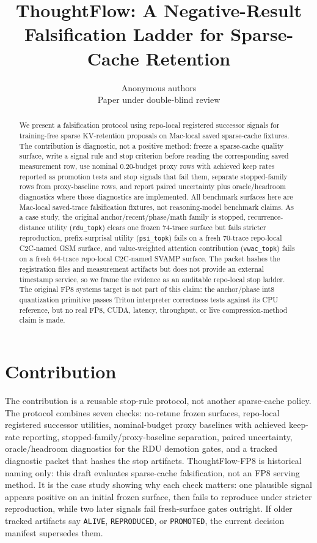 \documentclass{article}
\title{ThoughtFlow: A Negative-Result Falsification Ladder for Sparse-Cache Retention}
\author{Anonymous authors\\Paper under double-blind review}
\begin{document}
\maketitle

\begin{abstract}
We present a falsification protocol using repo-local registered successor signals for training-free sparse KV-retention proposals on Mac-local saved sparse-cache fixtures. The contribution is diagnostic, not a positive method: freeze a sparse-cache quality surface, write a signal rule and stop criterion before reading the corresponding saved measurement row, use nominal 0.20-budget proxy rows with achieved keep rates reported as promotion tests and stop signals that fail them, separate stopped-family rows from proxy-baseline rows, and report paired uncertainty plus oracle/headroom diagnostics where those diagnostics are implemented. All benchmark surfaces here are Mac-local saved-trace falsification fixtures, not reasoning-model benchmark claims. As a case study, the original anchor/recent/phase/math family is stopped, recurrence-distance utility (\texttt{rdu\_topk}) clears one frozen 74-trace surface but fails stricter reproduction, prefix-surprisal utility (\texttt{psi\_topk}) fails on a fresh 70-trace repo-local C2C-named GSM surface, and value-weighted attention contribution (\texttt{vwac\_topk}) fails on a fresh 64-trace repo-local C2C-named SVAMP surface. The packet hashes the registration files and measurement artifacts but does not provide an external timestamp service, so we frame the evidence as an auditable repo-local stop ladder. The original FP8 systems target is not part of this claim: the anchor/phase int8 quantization primitive passes Triton interpreter correctness tests against its CPU reference, but no real FP8, CUDA, latency, throughput, or live compression-method claim is made.
\end{abstract}

\section{Contribution}

The contribution is a reusable stop-rule protocol, not another sparse-cache
policy. The protocol combines seven checks: no-retune frozen surfaces,
repo-local registered successor utilities, nominal-budget proxy baselines with
achieved keep-rate reporting,
stopped-family/proxy-baseline separation, paired uncertainty,
oracle/headroom diagnostics for the RDU demotion gates, and a tracked
diagnostic packet that hashes the stop artifacts. ThoughtFlow-FP8 is historical
naming only: this draft evaluates sparse-cache falsification, not an FP8
serving method. It is the case study showing why each check matters: one
plausible signal appears positive on an initial frozen surface, then fails to
reproduce under stricter reproduction, while two later signals fail
fresh-surface gates outright.
If older tracked artifacts say \texttt{ALIVE}, \texttt{REPRODUCED}, or
\texttt{PROMOTED}, the current decision manifest supersedes them.
\end{document}

